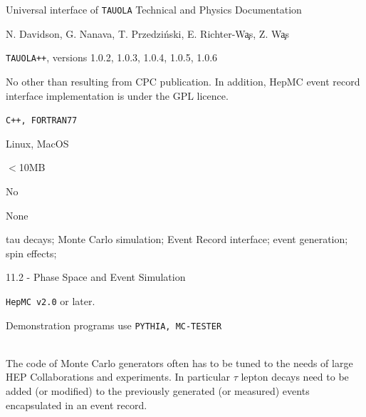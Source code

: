 \documentclass[]{Tauola_interface_design}
\begin{document}
\maketitle

\tableofcontents{}


\newpage


\vspace{10pt}


 \- Universal interface of {\tt TAUOLA} Technical
and Physics Documentation

 \- N. Davidson, G. Nanava, T. Przedzi\'nski, E. Richter-W\c as, Z. W\c as

 \- {\tt TAUOLA++}, versions 1.0.2, 1.0.3, 1.0.4, 1.0.5, 1.0.6

 \- No other than resulting from CPC publication.
In addition, HepMC event record interface implementation is under the GPL licence.

 \- {\tt C++, FORTRAN77 }

 \- Linux, MacOS

 \- $<$10MB

 \- No

 

 \- None

 \- tau decays; Monte Carlo simulation; Event Record interface; event generation; spin effects;

 11.2 - Phase Space and Event Simulation

 {\tt HepMC v2.0} or later.

 Demonstration programs use {\tt PYTHIA, MC-TESTER}



\\
The code of Monte Carlo generators often has to be tuned to the needs of large HEP
Collaborations and experiments. In particular $\tau$ lepton decays need to be added (or modified)
to the previously generated (or measured) events encapsulated in an event record. 
\end{document}
